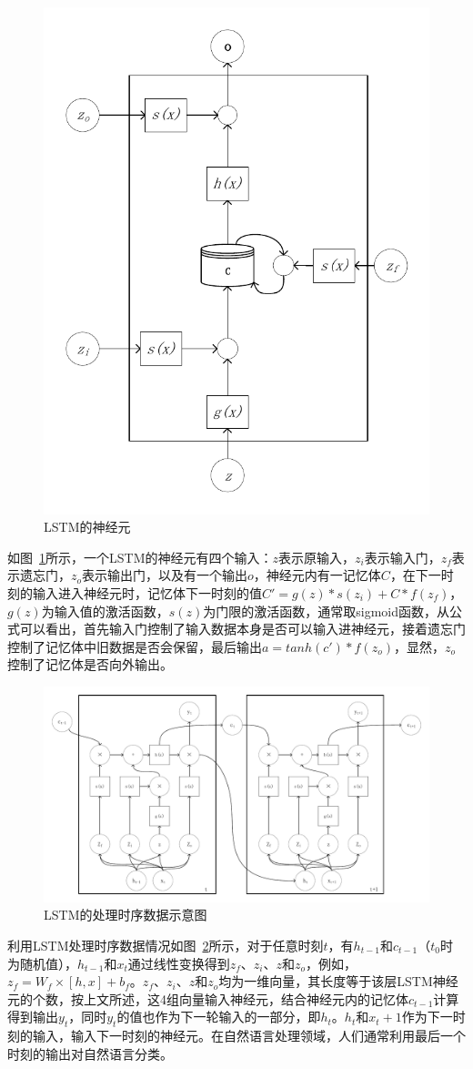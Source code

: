 \begin{figure}[htb]
	\centering
	\includegraphics[width=0.4\linewidth]{FIGs/chapter2/lstm_cell.pdf}
	\caption{LSTM的神经元}\label{lstmcell}
\end{figure}
如图~\ref{lstmcell}所示，一个LSTM的神经元有四个输入：$z$表示原输入，$z_i$表示输入门，$z_f$表示遗忘门，$z_o$表示输出门，以及有一个输出$o$，神经元内有一记忆体$C$，在下一时刻的输入进入神经元时，记忆体下一时刻的值$C'=g(z)*s(z_i)+C*f(z_f)$，$g(z)$为输入值的激活函数，$s(z)$为门限的激活函数，通常取sigmoid函数，从公式可以看出，首先输入门控制了输入数据本身是否可以输入进神经元，接着遗忘门控制了记忆体中旧数据是否会保留，最后输出$a=tanh(c')*f(z_o)$，显然，$z_o$控制了记忆体是否向外输出。

\begin{figure}[htb]
	\centering
	\includegraphics[width=0.8\linewidth]{FIGs/chapter2/lstm_time.pdf}
	\caption{LSTM的处理时序数据示意图}\label{lstmtime}
\end{figure}

利用LSTM处理时序数据情况如图~\ref{lstmtime}所示，对于任意时刻$t$，有$h_{t-1}$和$c_{t-1}$（$t_0$时为随机值），$h_{t-1}$和$x_t$通过线性变换得到$z_f$、$z_i$、$z$和$z_o$，例如，$z_f=W_{f}\times [h,x]+b_{f}$。$z_f$、$z_i$、$z$和$z_o$均为一维向量，其长度等于该层LSTM神经元的个数，按上文所述，这4组向量输入神经元，结合神经元内的记忆体$c_{t-1}$计算得到输出$y_t$，同时$y_t$的值也作为下一轮输入的一部分，即$h_t$。$h_t$和$x_t+1$作为下一时刻的输入，输入下一时刻的神经元。在自然语言处理领域，人们通常利用最后一个时刻的输出对自然语言分类。

